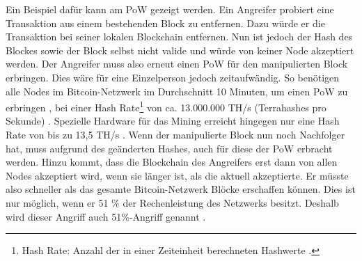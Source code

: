 Ein Beispiel dafür kann am \acs{PoW} gezeigt werden. Ein Angreifer probiert eine Transaktion aus einem bestehenden Block zu entfernen. Dazu würde er die Transaktion bei seiner lokalen Blockchain entfernen. Nun ist jedoch der Hash des Blockes sowie der Block selbst nicht valide und würde von keiner Node akzeptiert werden. Der Angreifer muss also erneut einen \acs{PoW} für den manipulierten Block erbringen. Dies wäre für eine Einzelperson jedoch zeitaufwändig. So benötigen alle Nodes im Bitcoin-Netzwerk im Durchschnitt 10 Minuten, um einen \acs{PoW} zu erbringen \cite[S.~173]{AntonopoulosMasteringbitcoin2015}, bei einer Hash Rate\footnote{Hash Rate: Anzahl der in einer Zeiteinheit berechneten Hashwerte \cite{BitcoinTeamBitcoinGlossar}.} von ca. 13.000.000 TH/s (Terrahashes pro Sekunde) \cite{EtherscanEthereumNetworkHashRate}. Spezielle Hardware für das Mining erreicht hingegen nur eine Hash Rate von bis zu 13,5 TH/s \cite{BitcoinminingLearnBitcoinmining}. Wenn der manipulierte Block nun noch Nachfolger hat, muss aufgrund des geänderten Hashes, auch für diese der \acs{PoW} erbracht werden. Hinzu kommt, dass die Blockchain des Angreifers erst dann von allen Nodes akzeptiert wird, wenn sie länger ist, als die aktuell akzeptierte. Er müsste also schneller als das gesamte Bitcoin-Netzwerk Blöcke erschaffen können. Dies ist nur möglich, wenn er 51 \% der Rechenleistung des Netzwerks besitzt. Deshalb wird dieser Angriff auch 51\%-Angriff genannt \cite[S.~83]{SwanBlockchainblueprintnew2015} \cite{EthereumTeamEthereumWhitePaper2017}. 

